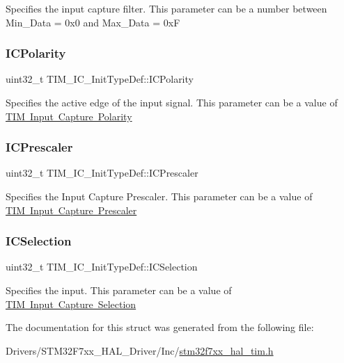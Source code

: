 Specifies the input capture filter. This parameter can be a number between Min\+\_\+\+Data = 0x0 and Max\+\_\+\+Data = 0xF \mbox{\label{struct_t_i_m___i_c___init_type_def_ab122383ebc0926c49a814546471da9b3}} 
\subsubsection{\texorpdfstring{ICPolarity}{ICPolarity}}
{\footnotesize\ttfamily uint32\+\_\+t T\+I\+M\+\_\+\+I\+C\+\_\+\+Init\+Type\+Def\+::\+I\+C\+Polarity}

Specifies the active edge of the input signal. This parameter can be a value of \mbox{\hyperlink{group___t_i_m___input___capture___polarity}{T\+IM Input Capture Polarity}} \mbox{\label{struct_t_i_m___i_c___init_type_def_a452a4a459b6f7b7c478db032de9b0d72}} 
\subsubsection{\texorpdfstring{ICPrescaler}{ICPrescaler}}
{\footnotesize\ttfamily uint32\+\_\+t T\+I\+M\+\_\+\+I\+C\+\_\+\+Init\+Type\+Def\+::\+I\+C\+Prescaler}

Specifies the Input Capture Prescaler. This parameter can be a value of \mbox{\hyperlink{group___t_i_m___input___capture___prescaler}{T\+IM Input Capture Prescaler}} \mbox{\label{struct_t_i_m___i_c___init_type_def_aad80556490de79727ba1269c851e9724}} 
\subsubsection{\texorpdfstring{ICSelection}{ICSelection}}
{\footnotesize\ttfamily uint32\+\_\+t T\+I\+M\+\_\+\+I\+C\+\_\+\+Init\+Type\+Def\+::\+I\+C\+Selection}

Specifies the input. This parameter can be a value of \mbox{\hyperlink{group___t_i_m___input___capture___selection}{T\+IM Input Capture Selection}} 

The documentation for this struct was generated from the following file\+:\begin{DoxyCompactItemize}
\item 
Drivers/\+S\+T\+M32\+F7xx\+\_\+\+H\+A\+L\+\_\+\+Driver/\+Inc/\mbox{\hyperlink{stm32f7xx__hal__tim_8h}{stm32f7xx\+\_\+hal\+\_\+tim.\+h}}\end{DoxyCompactItemize}
